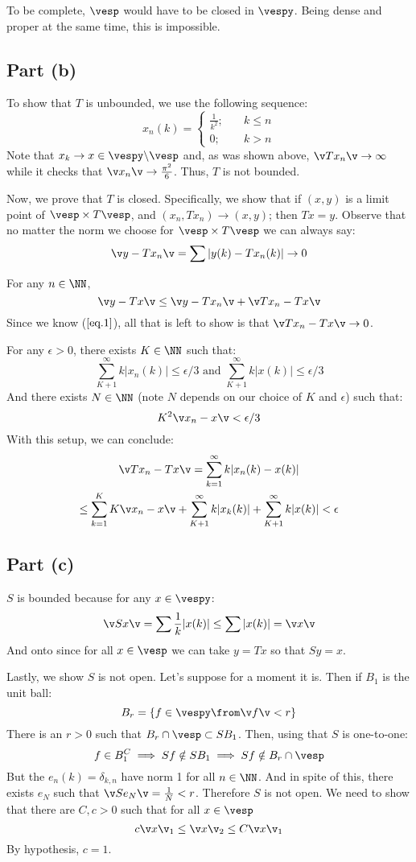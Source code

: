 To be complete, $\vesp$ would have to be closed in $\vespy$. Being dense and proper at the same time, this is impossible.
\subsection*{Part (b)}
To show that $T$ is unbounded, we use the following sequence:
\[x_n(k) = \begin{cases}
    \frac 1{k^2}; &\quad k\leq n\\
    0           ; &\quad k>n
\end{cases}\]
Note that $x_k \to x\in \vespy\backslash\vesp$ and, as was shown above, $\v Tx_n\v\to \infty$ while it checks that $\v x_n \v \to \frac{\pi^2}{6}$. Thus, $T$ is not bounded. 

Now, we prove that $T$ is closed. Specifically, we show that if $(x,y)$ is a limit point of $\vesp\times T\vesp$, and $(x_n,Tx_n)\to (x,y)$; then $Tx=y$. Observe that no matter the norm we choose for $\vesp\times T\vesp$ we can always say:
\begin{equation}\label{eq.1}
   \v y - Tx_n\v = \sum |y(k) - Tx_n(k)| \to 0
   \end{equation}

For any $n\in \NN$,
$$\v y - Tx\v \leq \v y - Tx_n\v + \v Tx_n - Tx\v$$
Since we know ($\ref{eq.1}$), all that is left to show is that $\v Tx_n - Tx\v\to 0$.

For any $\epsilon >0$, there exists $K\in \NN$ such that:
$$\sum_{K+1}^\infty k|x_n(k)| \leq \epsilon/3 \text{ and } \sum_{K+1}^\infty k|x(k)| \leq \epsilon/3$$
And there exists $N\in \NN$ (note $N$ depends on our choice of $K$ and $\epsilon$) such that:
$$K^2\v x_n -x\v < \epsilon/3$$
With this setup, we can conclude:
\begin{gather*}
    \v Tx_n - Tx\v = \sum_{k=1}^\infty k|x_n(k)-x(k)| \\
    \leq \sum_{k=1}^K K\v x_n-x\v + \sum_{K+1}^\infty k|x_k(k)| + \sum_{K+1}^\infty k|x(k)|  < \epsilon
\end{gather*}
\subsection*{Part (c)}
$S$ is bounded because for any $x\in \vespy$:
$$\v S x\v = \sum \frac 1k |x(k)| \leq \sum |x(k)| = \v x\v$$
And onto since for all $x\in \vesp$ we can take $y= Tx$ so that $ Sy = x$.

Lastly, we show $S$ is not open. Let's suppose for a moment it is. Then if $B_1$ is the unit ball:
$$B_r = \{f\in \vespy\from \v f \v <r\}$$
There is an $r>0$ such that $B_r \cap \vesp \subset SB_1$. Then, using that $S$ is one-to-one:
$$f\in B_1^C \implies Sf\notin SB_1 \implies Sf \notin B_r\cap \vesp$$
But the $e_n(k)=\delta_{k,n}$ have norm 1 for all $n\in \NN$. And in spite of this, there exists $e_N$ such that $\v Se_N\v = \frac 1N <r$. Therefore $S$ is not open.
We need to show that there are $C,c>0$ such that for all $x\in\vesp$
$$c\v x\v_1 \leq \v x \v_2 \leq C\v x\v _1$$
By hypothesis, $c=1$.

